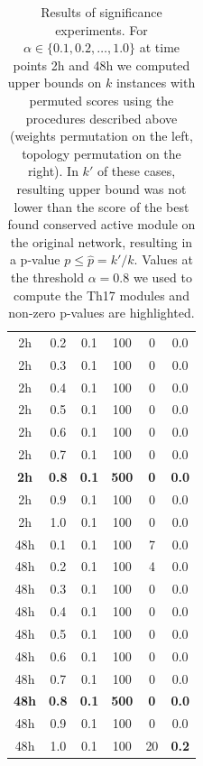 \begin{center}
\begin{table}[h]
{\begin{tabular}{| c | c | c | c | c | c |}
  \unit{2}{h}  & 0.2 & 0.1 & 100 & 0   & 0.0   \\
  \unit{2}{h}  & 0.3 & 0.1 & 100 & 0   & 0.0   \\
  \unit{2}{h}  & 0.4 & 0.1 & 100 & 0   & 0.0   \\
  \unit{2}{h}  & 0.5 & 0.1 & 100 & 0   & 0.0   \\
  \unit{2}{h}  & 0.6 & 0.1 & 100 & 0   & 0.0   \\
  \unit{2}{h}  & 0.7 & 0.1 & 100 & 0   & 0.0   \\
  \textbf{\unit{2}{h}}  & \textbf{0.8} & \textbf{0.1} & \textbf{500} & \textbf{0}   & \textbf{0.0}   \\
  \unit{2}{h}  & 0.9 & 0.1 & 100 & 0   & 0.0   \\
  \unit{2}{h}  & 1.0 & 0.1 & 100 & 0   & 0.0   \\ \hline
  \unit{48}{h} & 0.1 & 0.1 & 100 & 7   & 0.0   \\
  \unit{48}{h} & 0.2 & 0.1 & 100 & 4   & 0.0   \\
  \unit{48}{h} & 0.3 & 0.1 & 100 & 0   & 0.0   \\
  \unit{48}{h} & 0.4 & 0.1 & 100 & 0   & 0.0   \\
  \unit{48}{h} & 0.5 & 0.1 & 100 & 0   & 0.0   \\
  \unit{48}{h} & 0.6 & 0.1 & 100 & 0   & 0.0   \\
  \unit{48}{h} & 0.7 & 0.1 & 100 & 0   & 0.0   \\
  \textbf{\unit{48}{h}} & \textbf{0.8} & \textbf{0.1} & \textbf{500} & \textbf{0}   & \textbf{0.0}   \\
  \unit{48}{h} & 0.9 & 0.1 & 100 & 0   & 0.0   \\
  \unit{48}{h} & 1.0 & 0.1 & 100 & 20  & \textbf{0.2} \\
   \hline
  \end{tabular}}
  \caption[Results of significance experiments]{Results of significance experiments. For $\alpha \in \{0.1, 0.2,
  	\ldots, 1.0\}$ at time points \unit{2}{h} and \unit{48}{h} we computed upper
  	bounds on $k$ instances with permuted scores using the procedures described
  	above (weights permutation on the left, topology permutation on the right).
  	In $k'$ of these cases, %
  	resulting upper bound was not lower than the score of the best found
  	conserved active module on the original network, resulting in a p-value $p
  \leq \hat p = k'/k$. Values at the threshold $\alpha = 0.8$ we used to compute
  the Th17 modules and non-zero p-values are highlighted.}
  \label{tab:pval}
  \end{table}
  \end{center}

